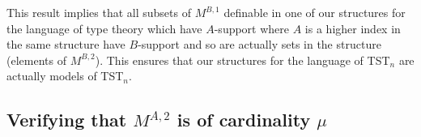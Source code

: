 \documentclass[12pt]{article}
\begin{document}
This result implies that all subsets of $M^{B,1}$ definable in one of our structures for the language of type theory which have $A$-support where $A$ is a higher index in the same structure
have $B$-support and so are actually sets in the structure (elements of $M^{B,2}$).  This ensures that our structures for the language of TST$_n$ are actually models of TST$_n$.

\subsection{Verifying that $M^{A,2}$ is of cardinality $\mu$}
\end{document}
